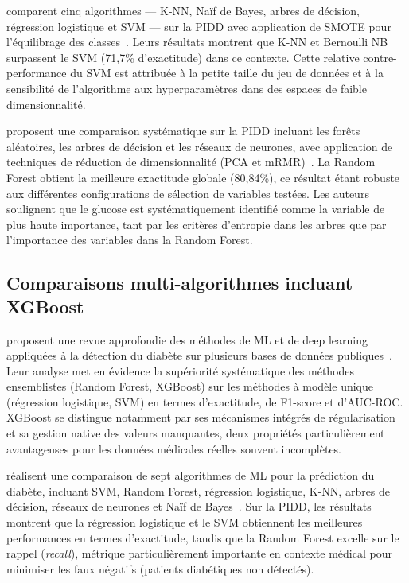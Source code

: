 \citeauthor{iparraguirre2023} comparent cinq algorithmes — K-NN, Naïf de Bayes, arbres de
décision, régression logistique et SVM — sur la PIDD avec application de SMOTE pour
l'équilibrage des classes~\citep{iparraguirre2023}. Leurs résultats montrent que K-NN et
Bernoulli NB surpassent le SVM (71,7\% d'exactitude) dans ce contexte. Cette relative
contre-performance du SVM est attribuée à la petite taille du jeu de données et à la
sensibilité de l'algorithme aux hyperparamètres dans des espaces de faible dimensionnalité.

\citeauthor{zou2018} proposent une comparaison systématique sur la PIDD incluant les
forêts aléatoires, les arbres de décision et les réseaux de neurones, avec application de
techniques de réduction de dimensionnalité (PCA et mRMR)~\citep{zou2018}. La Random
Forest obtient la meilleure exactitude globale (80,84\%), ce résultat étant robuste aux
différentes configurations de sélection de variables testées. Les auteurs soulignent que le
glucose est systématiquement identifié comme la variable de plus haute importance, tant par
les critères d'entropie dans les arbres que par l'importance des variables dans la Random
Forest.

\subsection{Comparaisons multi-algorithmes incluant XGBoost}

\citeauthor{wee2024} proposent une revue approfondie des méthodes de ML et de deep
learning appliquées à la détection du diabète sur plusieurs bases de données publiques~\citep{wee2024}. Leur analyse met en évidence la supériorité systématique des méthodes
ensemblistes (Random Forest, XGBoost) sur les méthodes à modèle unique (régression
logistique, SVM) en termes d'exactitude, de F1-score et d'AUC-ROC. XGBoost se distingue
notamment par ses mécanismes intégrés de régularisation et sa gestion native des valeurs
manquantes, deux propriétés particulièrement avantageuses pour les données médicales
réelles souvent incomplètes.

\citeauthor{khanam2021} réalisent une comparaison de sept algorithmes de ML pour la
prédiction du diabète, incluant SVM, Random Forest, régression logistique, K-NN, arbres de
décision, réseaux de neurones et Naïf de Bayes~\citep{khanam2021}. Sur la PIDD, les résultats
montrent que la régression logistique et le SVM obtiennent les meilleures performances en
termes d'exactitude, tandis que la Random Forest excelle sur le rappel (\textit{recall}),
métrique particulièrement importante en contexte médical pour minimiser les faux négatifs
(patients diabétiques non détectés).

